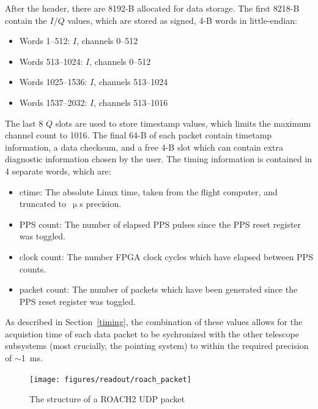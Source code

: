 After the header, there are 8192-B allocated for data storage. The first 8218-B contain the $I/Q$ values, which are stored as signed, 4-B words in little-endian:

\begin{itemize}[nosep]
  \item Words 1--512: $I$, channels 0--512
  \item Words 513--1024: $I$, channels 0--512
  \item Words 1025--1536: $I$, channels 513--1024
  \item Words 1537--2032: $I$, channels 513--1016
\end{itemize}

\vspace{5mm}

The last 8 $Q$ slots are used to store timestamp values, which limits the maximum channel count to 1016. The final 64-B of each packet contain timetamp information, a data checksum, and a free 4-B slot which can contain extra diagnostic information chosen by the user. The timing information is contained in 4 separate words, which are:

\begin{itemize}[nosep]
  \item ctime: The absolute Linux time, taken from the flight computer, and truncated to~$\upmu$s precision.
  \item PPS count: The number of elapsed PPS pulses since the PPS reset register was toggled.
  \item clock count: The number FPGA clock cycles which have elapsed between PPS counts.
  \item packet count: The number of packets which have been generated since the PPS reset register was toggled.
\end{itemize}

\vspace{5mm}

As described in Section~\ref{timing}, the combination of these values allows for the acquistion time of each data packet to be sychronized with the other telescope subsystems (most crucially, the pointing system) to within the required precision of $\sim$1~ms.

\begin{figure}[!htbp]
\centering
\texttt{[image: figures/readout/roach\_packet]}
\caption[~ROACH2 UDP packet structure.]{The structure of a ROACH2 UDP packet}
\label{fig:data packet}
\end{figure}

